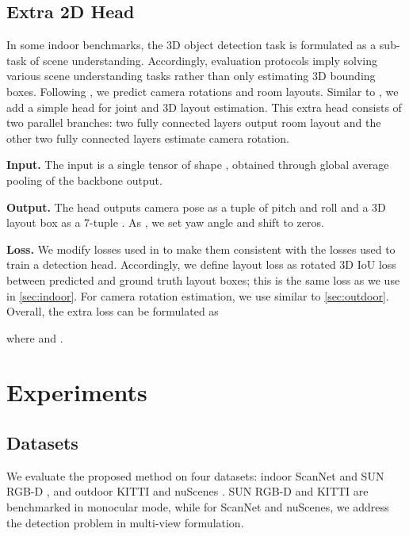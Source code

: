 \documentclass[10pt,twocolumn,letterpaper]{article}
\begin{document}
\subsection{Extra 2D Head}

In some indoor benchmarks, the 3D object detection task is formulated as a sub-task of scene understanding. Accordingly, evaluation protocols imply solving various scene understanding tasks rather than only estimating 3D bounding boxes. Following \cite{huang2018holistic, huang2018cooperative, nie2020total3dunderstanding}, we predict camera rotations and room layouts. Similar to \cite{nie2020total3dunderstanding}, we add a simple head for joint  and 3D layout estimation. This extra head consists of two parallel branches: two fully connected layers output room layout and the other two fully connected layers estimate camera rotation.

\textbf{Input.} The input is a single tensor of shape , obtained through global average pooling of the backbone output.

\textbf{Output.} The head outputs camera pose as a tuple of pitch  and roll  and a 3D layout box as a 7-tuple . As \cite{nie2020total3dunderstanding}, we set yaw angle and shift to zeros.

\textbf{Loss.} We modify losses used in \cite{nie2020total3dunderstanding} to make them consistent with the losses used to train a detection head. Accordingly, we define layout loss  as rotated 3D IoU loss between predicted and ground truth layout boxes; this is the same loss as we use in \ref{sec:indoor}. For camera rotation estimation, we use  similar to \ref{sec:outdoor}. Overall, the extra loss can be formulated as

where  and .

\section{Experiments}

\subsection{Datasets}

We evaluate the proposed method on four datasets: indoor ScanNet \cite{dai2017scannet} and SUN RGB-D \cite{song2015sunrgbd}, and outdoor KITTI \cite{geiger2012kitti} and nuScenes \cite{caesar2020nuscenes}. SUN RGB-D and KITTI are benchmarked in monocular mode, while for ScanNet and nuScenes, we address the detection problem in multi-view formulation.
\end{document}
